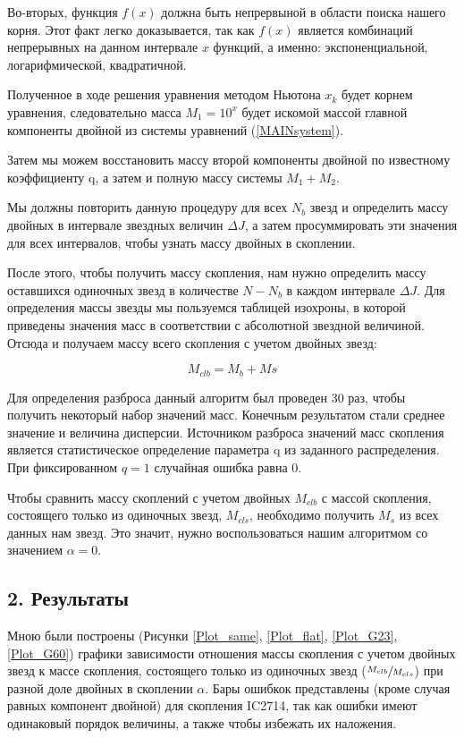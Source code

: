 \documentclass[a4paper,12pt]{article}
\begin{document}
Во-вторых, функция $f(x)$ должна быть непрервыной в области поиска нашего корня. Этот факт легко доказывается, так как $f(x)$ является комбинаций непрерывных на данном интервале $x$ функций, а именно: экспоненциальной, логарифмической, квадратичной.

Полученное в ходе решения уравнения методом Ньютона $x_k$ будет корнем уравнения, следовательно масса $M_1=10^x$ будет искомой массой главной компоненты двойной из системы уравнений (\ref{MAINsystem}).

Затем мы можем восстановить массу второй компоненты двойной по известному коэффициенту q, а затем и полную массу системы $M_1+M_2$.

Мы должны повторить данную процедуру для всех $N_{b}$  звезд и определить массу двойных в интервале звездных величин $\Delta J$, а затем просуммировать эти значения для всех интервалов, чтобы узнать массу двойных в скоплении.

После этого, чтобы получить массу скопления, нам нужно определить массу оставшихся одиночных звезд в количестве $N-N_{b}$ в каждом интервале $\Delta J$. Для определения массы звезды мы пользуемся таблицей изохроны, в которой приведены значения масс в соответствии с абсолютной звездной величиной. Отсюда и получаем массу всего скопления с учетом двойных звезд:

\begin{equation}
M_{clb} = M_{b}+M{s}
\end{equation}

Для определения разброса данный алгоритм был проведен 30 раз, чтобы получить некоторый набор значений масс. Конечным результатом стали среднее значение и величина дисперсии. Источником разброса значений масс скопления является статистическое определение параметра q из заданного распределения. При фиксированном $q=1$ случайная ошибка равна 0.

Чтобы сравнить массу скоплений с учетом двойных $M_{clb}$ с массой скопления, состоящего только из одиночных звезд, $M_{cls}$, необходимо получить $M_{s}$ из всех данных нам звезд. Это значит, нужно воспользоваться нашим алгоритмом со значением $\alpha = 0$.

\subsection{2. Результаты}

Мною были построены (Рисунки \ref{Plot_same}, \ref{Plot_flat}, \ref{Plot_G23}, \ref{Plot_G60}) графики зависимости отношения массы скопления с учетом двойных звезд к массе скопления, состоящего только из одиночных звезд ($\sfrac{M_{clb}}{M_{cls}}$) при разной доле двойных в скоплении $\alpha$. Бары ошибкок представлены (кроме случая равных компонент двойной) для скопления IC2714, так как ошибки имеют одинаковый порядок величины, а также чтобы избежать их наложения. 
\end{document}
